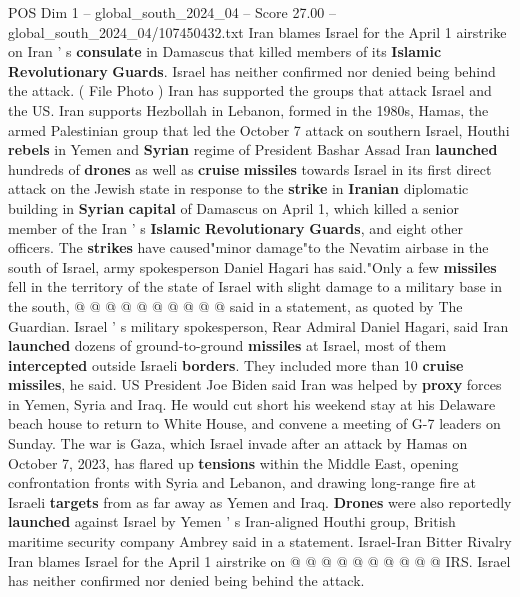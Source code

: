 \begin{textsample}{POS Dim 1 – global\_south\_2024\_04 – Score 27.00 – global\_south\_2024\_04/107450432.txt}  \label{ex:f1_pos_047}
Iran blames Israel for the April 1 airstrike on Iran ' s \textbf{consulate} in Damascus that killed members of its \textbf{Islamic} \textbf{Revolutionary} \textbf{Guards}.
Israel has neither confirmed nor denied being behind the attack. ( File Photo ) Iran has supported the groups that attack Israel and the US.
Iran supports Hezbollah in Lebanon, formed in the 1980s, Hamas, the armed Palestinian group that led the October 7 attack on southern Israel, Houthi \textbf{rebels} in Yemen and \textbf{Syrian} regime of President Bashar Assad Iran \textbf{launched} hundreds of \textbf{drones} as well as \textbf{cruise} \textbf{missiles} towards Israel in its first direct attack on the Jewish state in response to the \textbf{strike} in \textbf{Iranian} diplomatic building in \textbf{Syrian} \textbf{capital} of Damascus on April 1, which killed a senior member of the Iran ' s \textbf{Islamic} \textbf{Revolutionary} \textbf{Guards}, and eight other officers.
The \textbf{strikes} have caused"minor damage"to the Nevatim airbase in the south of Israel, army spokesperson Daniel Hagari has said."Only a few \textbf{missiles} fell in the territory of the state of Israel with slight damage to a military base in the south, @ @ @ @ @ @ @ @ @ @ said in a statement, as quoted by The Guardian.
Israel ' s military spokesperson, Rear Admiral Daniel Hagari, said Iran \textbf{launched} dozens of ground-to-ground \textbf{missiles} at Israel, most of them \textbf{intercepted} outside Israeli \textbf{borders}.
They included more than 10 \textbf{cruise} \textbf{missiles}, he said.
US President Joe Biden said Iran was helped by \textbf{proxy} forces in Yemen, Syria and Iraq.
He would cut short his weekend stay at his Delaware beach house to return to White House, and convene a meeting of G-7 leaders on Sunday.
The war is Gaza, which Israel invade after an attack by Hamas on October 7, 2023, has flared up \textbf{tensions} within the Middle East, opening confrontation fronts with Syria and Lebanon, and drawing long-range fire at Israeli \textbf{targets} from as far away as Yemen and Iraq. \textbf{Drones} were also reportedly \textbf{launched} against Israel by Yemen ' s Iran-aligned Houthi group, British maritime security company Ambrey said in a statement.
Israel-Iran Bitter Rivalry Iran blames Israel for the April 1 airstrike on @ @ @ @ @ @ @ @ @ @ IRS.
Israel has neither confirmed nor denied being behind the attack.

\end{textsample}
